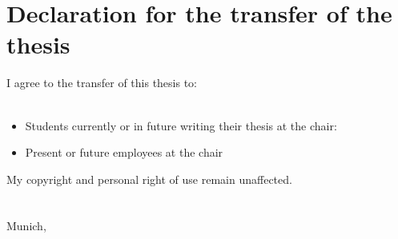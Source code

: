 
\chapter*{Declaration for the transfer of the thesis}

I agree to the transfer of this thesis to:\\
\\
\begin{itemize}
	\item Students currently or in future writing their thesis at the chair:
	\item Present or future employees at the chair
\end{itemize}
My copyright and personal right of use remain unaffected.\\
\\
\vspace*{2cm}\\
Munich, \dateosub \hspace{0.5cm} \makebox[1.5in]{\hrulefill}